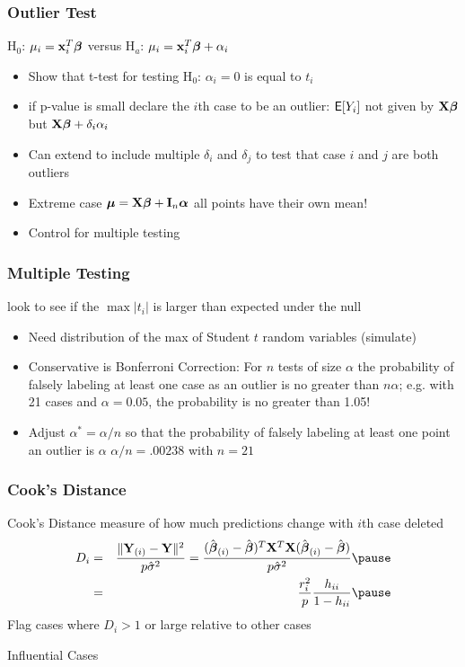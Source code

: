 \documentclass[]{beamer}
\begin{document}
  \begin{frame}
    \frametitle{Outlier Test}
    H$_0$: $\mu_i = \mathbf{x}_i^T \boldsymbol{\beta}$  versus H$_a$: $\mu_i = \mathbf{x}_i^T\boldsymbol{\beta} +
    \alpha_i$  \pause
    \begin{itemize}
    \item  Show that t-test for testing H$_0$: $\alpha_i = 0$ is equal
      to $t_i$   \pause
  \item if p-value is
small declare the $i$th case to be an outlier:  $\textsf{E}[Y_i]$ not given by
$\mathbf{X} \boldsymbol{\beta}$  but $\mathbf{X}\boldsymbol{\beta} + \delta_i \alpha_i$    \pause
\item Can extend to include multiple $\delta_i$ and $\delta_j$ to test
  that case $i$ and $j$ are both outliers \pause
\item Extreme case $\boldsymbol{\mu} = \mathbf{X}\boldsymbol{\beta} + \mathbf{I}_n \boldsymbol{\alpha}$  all points have their
  own mean!   \pause
\item Control for multiple testing  \pause
    \end{itemize}
  \end{frame}
  \begin{frame}
    \frametitle{Multiple Testing}
    look to see if the $\max |t_i|$ is larger than expected under the
    null \pause
    \begin{itemize}
    \item Need distribution of the max of Student $t$ random variables
      (simulate) \pause
\item Conservative is Bonferroni Correction:  For $n$ tests of size
  $\alpha$ the probability of falsely labeling at least one case as an
  outlier is no greater than $n \alpha$; e.g. with 21 cases and
  $\alpha = 0.05$, the probability is no greater than 1.05!
\pause
\item Adjust $\alpha^* = \alpha/n$ so that the probability of falsely
  labeling at least one point an outlier is $\alpha$
  $\alpha/n = .00238$ with $n=21$
\pause
    \end{itemize}
  \end{frame}
  \begin{frame}
    \frametitle{Cook's Distance}
    Cook's Distance  measure of how much predictions change with $i$th
    case deleted  \pause
    \begin{eqnarray*}
D_i & =  &\frac{\| \Y_{(i)} - \Y \|^2}{ p \shat} = 
\frac{ (\bhat_{(i)} - \bhat)^T \X^T\X (\bhat_{(i)} - \bhat) }{ p
  \shat}  \pause \\
& = & \frac{r_i^2}{p} \frac{h_{ii}}{ 1 - h_{ii}}  \pause
    \end{eqnarray*}
Flag cases where $D_i > 1$ or large relative to other cases
 \pause

\vspace{18pt}
Influential Cases
  \end{frame}
\end{document}
